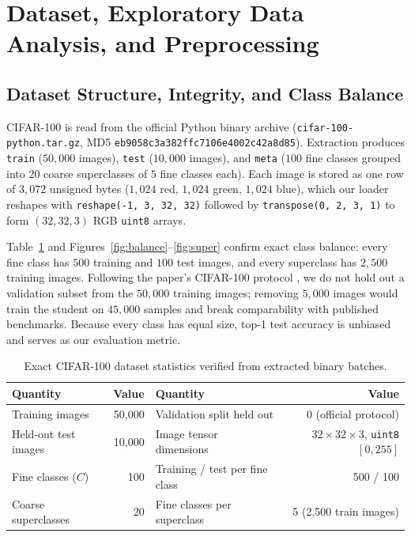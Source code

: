 \documentclass[11pt]{article}
\begin{document}
\section{Dataset, Exploratory Data Analysis, and Preprocessing}
\label{sec:eda}

\subsection{Dataset Structure, Integrity, and Class Balance}

CIFAR-100 \cite{krizhevsky2009} is read from the official Python binary archive (\texttt{cifar-100-python.tar.gz}, MD5 \texttt{eb9058c3a382ffc7106e4002c42a8d85}). Extraction produces \texttt{train} (\(50{,}000\) images), \texttt{test} (\(10{,}000\) images), and \texttt{meta} (\(100\) fine classes grouped into \(20\) coarse superclasses of \(5\) fine classes each). Each image is stored as one row of \(3{,}072\) unsigned bytes (\(1{,}024\) red, \(1{,}024\) green, \(1{,}024\) blue), which our loader reshapes with \texttt{reshape(-1, 3, 32, 32)} followed by \texttt{transpose(0, 2, 3, 1)} to form \((32, 32, 3)\) RGB \texttt{uint8} arrays.

Table~\ref{tab:stats} and Figures~\ref{fig:balance}--\ref{fig:super} confirm exact class balance: every fine class has \(500\) training and \(100\) test images, and every superclass has \(2{,}500\) training images. Following the paper's CIFAR-100 protocol \cite{zhao2022}, we do not hold out a validation subset from the \(50{,}000\) training images; removing \(5{,}000\) images would train the student on \(45{,}000\) samples and break comparability with published benchmarks. Because every class has equal size, top-1 test accuracy is unbiased and serves as our evaluation metric.

\begin{table}[H]
\centering
\small
\caption{Exact CIFAR-100 dataset statistics verified from extracted binary batches.}
\label{tab:stats}
\begin{tabular}{@{}lrlr@{}}
\toprule
\textbf{Quantity} & \textbf{Value} & \textbf{Quantity} & \textbf{Value} \\
\midrule
Training images & 50{,}000 & Validation split held out & 0 (official protocol) \\
Held-out test images & 10{,}000 & Image tensor dimensions & \(32 \times 32 \times 3\), \texttt{uint8} \([0, 255]\) \\
Fine classes (\(C\)) & 100 & Training / test per fine class & 500 / 100 \\
Coarse superclasses & 20 & Fine classes per superclass & 5 (2{,}500 train images) \\
\bottomrule
\end{tabular}
\end{table}
\end{document}
